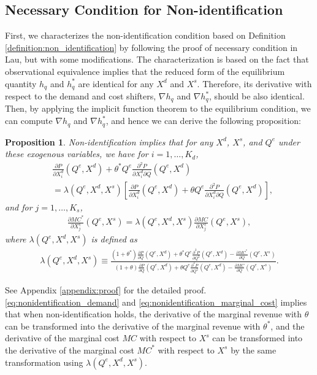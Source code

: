 \documentclass[11pt, a4paper]{article}
\newtheorem{proposition}{Proposition}
\theoremstyle{remark}
\begin{document}
\subsection{Necessary Condition for Non-identification}

First, we characterizes the non-identification condition based on Definition \ref{definition:non_identification} by following the proof of necessary condition in Lau, but with some modifications.
The characterization is based on the fact that observational equivalence implies that the reduced form of the equilibrium quantity $h_q$ and $h_q^{*}$ are identical for any $X^{d}$ and $X^{s}$.
Therefore, its derivative with respect to the demand and cost shifters, $\nabla h_q$ and $\nabla h_q^{*}$, should be also identical.
Then, by applying the implicit function theorem to the equilibrium condition, we can compute $\nabla h_q$ and $\nabla h_q^{*}$, and hence we can derive the following proposition:
\begin{proposition}\label{proposition:nonidentification_charaterization}
    Non-identification implies that for any $X^{d}$, $X^{s}$, and $Q^e$ under these exogenous variables, we have for $i = 1, \ldots, K_d$,
    \begin{align}
        &\frac{\partial P}{\partial X^{d}_{i}}(Q^e, X^{d}) + \theta^{*} Q^e \frac{\partial^2 P}{\partial X^{d}_{i}\partial Q}(Q^e, X^{d})\\  
        &= \lambda(Q^e, X^{d}, X^{s})\left[ \frac{\partial P}{\partial X^{d}_{i}}(Q^e, X^{d}) + \theta Q^e \frac{\partial^2 P}{\partial X^{d}_{i}\partial Q}(Q^e, X^{d}) \right], \label{eq:nonidentification_demand}
    \end{align}
    and for $j = 1,\ldots, K_s$,
    \begin{align}
        \frac{\partial MC^{*}}{\partial X^{s}_j}(Q^e, X^{s}) = \lambda(Q^e, X^{d}, X^{s}) \frac{\partial MC}{\partial X^{s}_j}(Q^e, X^{s}),\label{eq:nonidentification_marginal_cost}
    \end{align}
    where $\lambda(Q^e, X^{d}, X^{s})$ is defined as
    \begin{align}
        \lambda(Q^e, X^{d}, X^{s}) \equiv \frac{(1+\theta^{*})\frac{\partial P}{\partial Q}(Q^e, X^{d}) + \theta^{*} Q^e\frac{\partial^2 P}{\partial Q^2}(Q^e, X^{d}) - \frac{\partial MC^{*}}{\partial Q}(Q^e, X^{s})}{(1+\theta)\frac{\partial P}{\partial Q}(Q^e, X^{d}) + \theta Q^e\frac{\partial^2 P}{\partial Q^2}(Q^e, X^{d}) - \frac{\partial MC}{\partial Q}(Q^e, X^{s})}. \label{eq:lambda_foc}
    \end{align}
\end{proposition}
See Appendix \ref{appendix:proof} for the detailed proof.
\eqref{eq:nonidentification_demand} and \eqref{eq:nonidentification_marginal_cost} implies that when non-identification holds, the derivative of the marginal revenue with $\theta$ can be transformed into the derivative of the marginal revenue with $\theta^{*}$, and the derivative of the marginal cost $MC$ with respect to $X^{s}$ can be transformed into the derivative of the marginal cost $MC^{*}$ with respect to $X^{s}$ by the same transformation using $\lambda(Q^e, X^{d}, X^{s})$.
\end{document}
